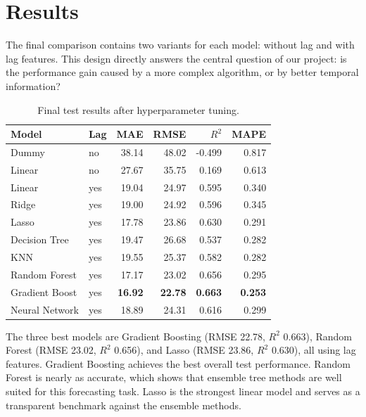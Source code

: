 \section{Results}
\label{sec:results}

The final comparison contains two variants for each model: without lag 
and with lag features. This design directly answers the central question 
of our project: is the performance gain caused by a more complex 
algorithm, or by better temporal information?

\begin{table}[htbp]
\caption{Final test results after hyperparameter tuning.}
\label{tab:results}
\centering
\scriptsize
\begin{tabularx}{\columnwidth}{p{} l r r r r}
\toprule
\textbf{Model} & \textbf{Lag} & \textbf{MAE} & \textbf{RMSE} & 
\textbf{$R^2$} & \textbf{MAPE} \\
\midrule
Dummy          & no  & 38.14 & 48.02 & -0.499 & 0.817 \\
Linear         & no  & 27.67 & 35.75 &  0.169 & 0.613 \\
Linear         & yes & 19.04 & 24.97 &  0.595 & 0.340 \\
Ridge          & yes & 19.00 & 24.92 &  0.596 & 0.345 \\
Lasso          & yes & 17.78 & 23.86 &  0.630 & 0.291 \\
Decision Tree  & yes & 19.47 & 26.68 &  0.537 & 0.282 \\
KNN            & yes & 19.55 & 25.37 &  0.582 & 0.282 \\
Random Forest  & yes & 17.17 & 23.02 &  0.656 & 0.295 \\
Gradient Boost & yes & \textbf{16.92} & \textbf{22.78} & 
                       \textbf{0.663} & \textbf{0.253} \\
Neural Network & yes & 18.89 & 24.31 &  0.616 & 0.299 \\
\bottomrule
\end{tabularx}
\end{table}

The three best models are Gradient Boosting (RMSE 22.78, $R^2$ 0.663), 
Random Forest (RMSE 23.02, $R^2$ 0.656), and Lasso (RMSE 23.86, 
$R^2$ 0.630), all using lag features. Gradient Boosting achieves the 
best overall test performance. Random Forest is nearly as accurate, 
which shows that ensemble tree methods are well suited for this 
forecasting task. Lasso is the strongest linear model and serves as a 
transparent benchmark against the ensemble methods.

